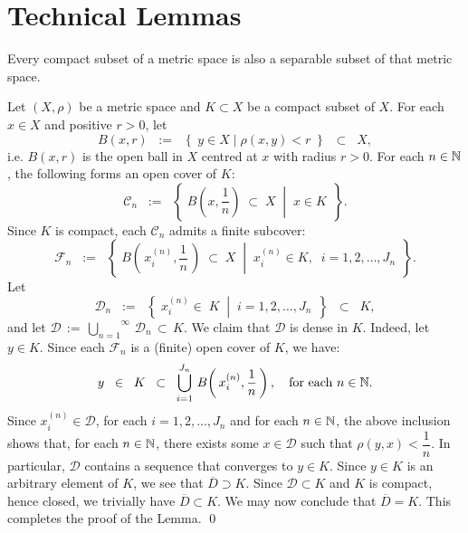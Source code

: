 

\section{Technical Lemmas}
\setcounter{theorem}{0}
\setcounter{equation}{0}

\renewcommand{\theenumi}{\roman{enumi}}
\renewcommand{\labelenumi}{\textnormal{(\theenumi)}$\;\;$}

\begin{lemma}
\mbox{}
\vskip 0.3cm
\noindent
Every compact subset of a metric space is also a separable subset of that metric space.
\end{lemma}
\proof
Let $(X,\rho)$ be a metric space and $K \subset X$ be a compact subset of $X$.
For each $x \in X$ and positive $r > 0$, let
\begin{equation*}
B(x,r)
\;\; := \;\; \left\{\;y \in X \;\vert\; \rho(x,y) < r \;\right\}
\;\;\subset\;\; X,
\end{equation*}
i.e. $B(x,r)$ is the open ball in $X$ centred at $x$ with radius $r > 0$.
For each $n \in \mathbb{N}$, the following forms an open cover of $K$:
\begin{equation*}
\mathcal{C}_{n}
\;\; := \;\;
\left\{\;
\left.
B\!\left(x,\dfrac{1}{n}\right) \;\subset\; X
\;\;\right\vert\;\;
x \in K
\,\;\right\}.
\end{equation*}
Since $K$ is compact, each $\mathcal{C}_{n}$ admits a finite subcover:
\begin{equation*}
\mathcal{F}_{n}
\;\; := \;\;
\left\{\;
\left.
B\!\left(\,x^{(n)}_{i},\dfrac{1}{n}\,\right) \;\subset\; X
\;\;\right\vert\;\;
x^{(n)}_{i} \in K,\;\;
i = 1, 2, \ldots, J_{n}
\,\;\right\}.
\end{equation*}
Let
\begin{equation*}
\mathcal{D}_{n}
\;\; := \;\;
\left\{\;
\left.
x^{(n)}_{i} \in\; K
\;\;\right\vert\;\;
i = 1, 2, \ldots, J_{n}
\,\;\right\}
\;\; \subset \;\; K,
\end{equation*}
and let $\mathcal{D} \,:=\, \overset{\infty}{\underset{n=1}{\bigcup}}\,\mathcal{D}_{n} \,\subset\, K$.
We claim that $\mathcal{D}$ is dense in $K$.
Indeed, let $y \in K$. Since each $\mathcal{F}_{n}$ is a (finite) open cover of $K$, we have:
\begin{equation*}
y \;\; \in \;\; K \;\; \subset \;\; \bigcup_{i=1}^{J_{n}}\,B\!\left(\,x^{(n)}_{i},\dfrac{1}{n}\,\right),
\quad
\textnormal{for each $n \in \mathbb{N}$}.
\end{equation*}
Since $x^{(n)}_{i} \in \mathcal{D}$, for each $i = 1, 2, \ldots, J_{n}$ and for each $n \in \mathbb{N}$,
the above inclusion shows that, for each $n \in \mathbb{N}$, there exists some $x \in \mathcal{D}$ such that $\rho(y,x) < \dfrac{1}{n}$.
In particular, $\mathcal{D}$ contains a sequence that converges to $y \in K$.
Since $y \in K$ is an arbitrary element of $K$, we see that $\overline{D} \supset K$.
Since $\mathcal{D} \subset K$ and $K$ is compact, hence closed, we trivially have $\overline{D} \subset K$.
We may now conclude that $\overline{D} = K$.
This completes the proof of the Lemma.
\qed

